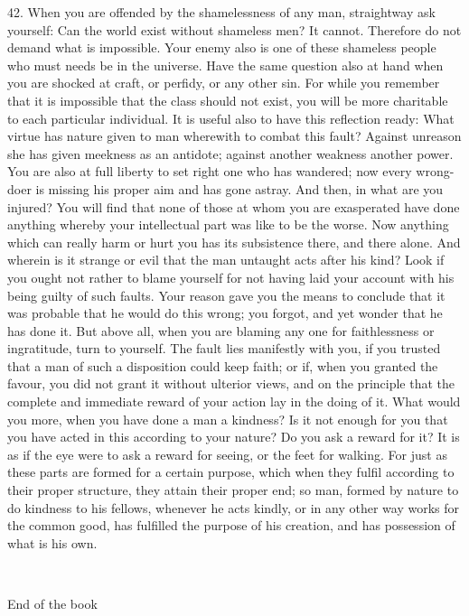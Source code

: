 \documentclass{book}
\newcommand\terminus[1]{\vspace{2em}\emph{#1} \\[2em] \begin{center}End of the \ordinalstring{chapter} book\end{center}}
\begin{document}
42. When you are offended by the shamelessness of any man, straightway
ask yourself: Can the world exist without shameless men? It
cannot. Therefore do not demand what is impossible. Your enemy also is
one of these shameless people who must needs be in the universe. Have
the same question also at hand when you are shocked at craft, or
perfidy, or any other sin. For while you remember that it is
impossible that the class should not exist, you will be more
charitable to each particular individual. It is useful also to have
this reflection ready: What virtue has nature given to man wherewith
to combat this fault? Against unreason she has given meekness as an
antidote; against another weakness another power. You are also at full
liberty to set right one who has wandered; now every wrong-doer is
missing his proper aim and has gone astray. And then, in what are you
injured? You will find that none of those at whom you are exasperated
have done anything whereby your intellectual part was like to be the
worse. Now anything which can really harm or hurt you has its
subsistence there, and there alone. And wherein is it strange or evil
that the man untaught acts after his kind? Look if you ought not
rather to blame yourself for not having laid your account with his
being guilty of such faults. Your reason gave you the means to
conclude that it was probable that he would do this wrong; you forgot,
and yet wonder that he has done it. But above all, when you are
blaming any one for faithlessness or ingratitude, turn to
yourself. The fault lies manifestly with you, if you trusted that a
man of such a disposition could keep faith; or if, when you granted
the favour, you did not grant it without ulterior views, and on the
principle that the complete and immediate reward of your action lay in
the doing of it. What would you more, when you have done a man a
kindness? Is it not enough for you that you have acted in this
according to your nature? Do you ask a reward for it? It is as if the
eye were to ask a reward for seeing, or the feet for walking. For just
as these parts are formed for a certain purpose, which when they
fulfil according to their proper structure, they attain their proper
end; so man, formed by nature to do kindness to his fellows, whenever
he acts kindly, or in any other way works for the common good, has
fulfilled the purpose of his creation, and has possession of what is
his own.

\terminus{}
\chapter[Wilt thou ever,...]{}
\end{document}
